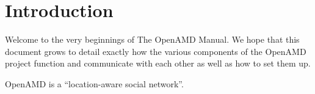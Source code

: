 \chapter{Introduction}

Welcome to the very beginnings of The OpenAMD Manual.
We hope that this document grows to detail exactly how
the various components of the OpenAMD project function
and communicate with each other
as well as how to set them up.

OpenAMD is a ``location-aware social network''.


